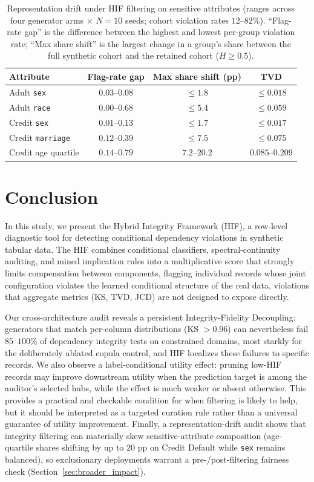 \documentclass[pdflatex,sn-mathphys-num]{sn-jnl}
\theoremstyle{thmstyleone}%
\theoremstyle{thmstyletwo}%
\theoremstyle{thmstylethree}%
\begin{document}
\begin{table}[htbp]
\centering
\caption{Representation drift under HIF filtering on sensitive attributes (ranges across four generator arms $\times$ $N=10$ seeds; cohort violation rates $12$--$82\%$). ``Flag-rate gap'' is the difference between the highest and lowest per-group violation rate; ``Max share shift'' is the largest change in a group's share between the full synthetic cohort and the retained cohort ($H \ge 0.5$).}
\label{tab:drift}
\footnotesize
\setlength{\tabcolsep}{4pt}
\begin{tabular}{@{}lccc@{}}
\toprule
Attribute & Flag-rate gap & Max share shift (pp) & TVD \\
\midrule
Adult \texttt{sex} & $0.03$--$0.08$ & $\le 1.8$ & $\le 0.018$ \\
Adult \texttt{race} & $0.00$--$0.68$ & $\le 5.4$ & $\le 0.059$ \\
Credit \texttt{sex} & $0.01$--$0.13$ & $\le 1.7$ & $\le 0.017$ \\
Credit \texttt{marriage} & $0.12$--$0.39$ & $\le 7.5$ & $\le 0.075$ \\
Credit age quartile & $0.14$--$0.79$ & $7.2$--$20.2$ & $0.085$--$0.209$ \\
\bottomrule
\end{tabular}
\end{table}

\section{Conclusion}

In this study, we present the Hybrid Integrity Framework (HIF), a row-level diagnostic tool for detecting conditional dependency violations in synthetic tabular data. The HIF combines conditional classifiers, spectral-continuity auditing, and mined implication rules into a multiplicative score that strongly limits compensation between components, flagging individual records whose joint configuration violates the learned conditional structure of the real data, violations that aggregate metrics (KS, TVD, JCD) are not designed to expose directly.

Our cross-architecture audit reveals a persistent Integrity-Fidelity Decoupling: generators that match per-column distributions (KS $> 0.96$) can nevertheless fail $85$--$100\%$ of dependency integrity tests on constrained domains, most starkly for the deliberately ablated copula control, and HIF localizes these failures to specific records. We also observe a label-conditional utility effect: pruning low-HIF records may improve downstream utility when the prediction target is among the auditor's selected hubs, while the effect is much weaker or absent otherwise. This provides a practical and checkable condition for when filtering is likely to help, but it should be interpreted as a targeted curation rule rather than a universal guarantee of utility improvement. Finally, a representation-drift audit shows that integrity filtering can materially skew sensitive-attribute composition (age-quartile shares shifting by up to $20$ pp on Credit Default while \texttt{sex} remains balanced), so exclusionary deployments warrant a pre-/post-filtering fairness check (Section~\ref{sec:broader_impact}).
\end{document}
